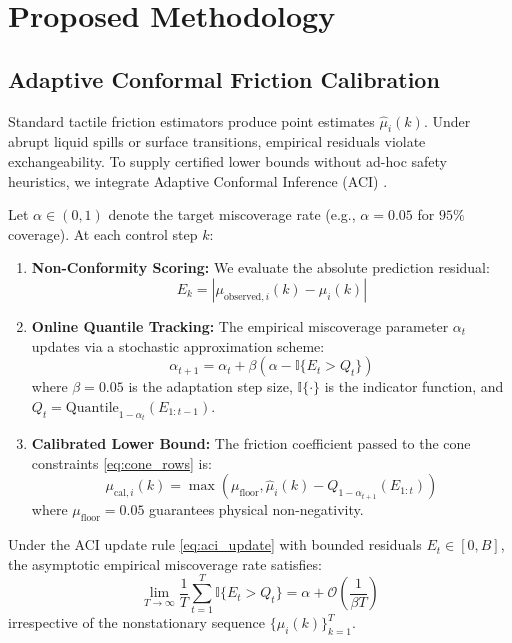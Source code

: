 \section{Proposed Methodology}
\label{sec:methodology}

\subsection{Adaptive Conformal Friction Calibration}
Standard tactile friction estimators produce point estimates $\hat{\mu}_i(k)$. Under abrupt liquid spills or surface transitions, empirical residuals violate exchangeability. To supply certified lower bounds without ad-hoc safety heuristics, we integrate Adaptive Conformal Inference (ACI) \cite{gibbs2021adaptive}.

Let $\alpha \in (0, 1)$ denote the target miscoverage rate (e.g., $\alpha = 0.05$ for $95\%$ coverage). At each control step $k$:
\begin{enumerate}
    \item \textbf{Non-Conformity Scoring:} We evaluate the absolute prediction residual:
    \begin{equation}
        E_k = |\mu_{\text{observed}, i}(k) - \hat{\mu}_i(k)|
    \end{equation}
    \item \textbf{Online Quantile Tracking:} The empirical miscoverage parameter $\alpha_t$ updates via a stochastic approximation scheme:
    \begin{equation}
        \alpha_{t+1} = \alpha_t + \beta \left( \alpha - \mathbb{I}\{E_t > Q_t\} \right)
        \label{eq:aci_update}
    \end{equation}
    where $\beta = 0.05$ is the adaptation step size, $\mathbb{I}\{\cdot\}$ is the indicator function, and $Q_t = \text{Quantile}_{1 - \alpha_t}(E_{1:t-1})$.
    \item \textbf{Calibrated Lower Bound:} The friction coefficient passed to the cone constraints \eqref{eq:cone_rows} is:
    \begin{equation}
        \mu_{\text{cal}, i}(k) = \max\left( \mu_{\text{floor}}, \hat{\mu}_i(k) - Q_{1 - \alpha_{t+1}}(E_{1:t}) \right)
        \label{eq:mu_cal}
    \end{equation}
    where $\mu_{\text{floor}} = 0.05$ guarantees physical non-negativity.
\end{enumerate}

\begin{proposition}
\label{prop:aci_coverage}
Under the ACI update rule \eqref{eq:aci_update} with bounded residuals $E_t \in [0, B]$, the asymptotic empirical miscoverage rate satisfies:
\begin{equation}
    \lim_{T \to \infty} \frac{1}{T} \sum_{t=1}^T \mathbb{I}\{E_t > Q_t\} = \alpha + \mathcal{O}\left( \frac{1}{\beta T} \right)
\end{equation}
irrespective of the nonstationary sequence $\{\mu_i(k)\}_{k=1}^T$.
\end{proposition}

